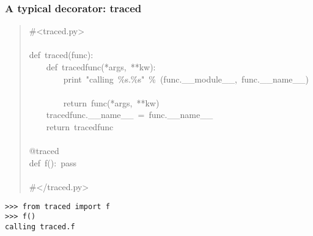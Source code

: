 \documentclass[10pt,a4paper,english]{article}
\begin{document}
\hypertarget{a-typical-decorator-traced}{}
\subsubsection*{A typical decorator: traced}
\begin{quote}{\ttfamily \raggedright \noindent
{\#}<traced.py>~\\
~\\
def~traced(func):~\\
~~~~def~tracedfunc(*args,~**kw):~\\
~~~~~~~~print~"calling~{\%}s.{\%}s"~{\%}~(func.{\_}{\_}module{\_}{\_},~func.{\_}{\_}name{\_}{\_})~\\
~~~~~~~~return~func(*args,~**kw)~\\
~~~~tracedfunc.{\_}{\_}name{\_}{\_}~=~func.{\_}{\_}name{\_}{\_}~\\
~~~~return~tracedfunc~\\
~\\
@traced~\\
def~f():~pass~\\
~\\
{\#}</traced.py>
}\end{quote}
\begin{verbatim}>>> from traced import f
>>> f()
calling traced.f\end{verbatim}



\hypertarget{a-decorator-factory-timed}{}
\end{document}
